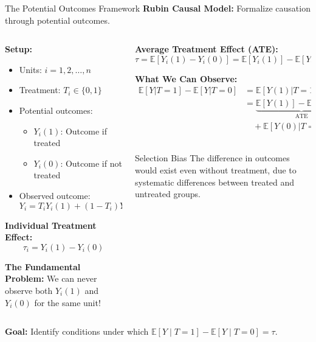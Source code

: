 \documentclass[aspectratio=169,11pt]{beamer}
\newcommand{\E}{\mathbb{E}}
\begin{document}
\begin{frame}{The Potential Outcomes Framework}
\textbf{Rubin Causal Model:} Formalize causation through potential outcomes.

\begin{columns}
\begin{column}{0.5\textwidth}
\textbf{Setup:}
\begin{itemize}
\item Units: $i = 1, 2, \ldots, n$
\item Treatment: $T_i \in \{0, 1\}$
\item Potential outcomes: 
  \begin{itemize}
  \item $Y_i(1)$: Outcome if treated
  \item $Y_i(0)$: Outcome if not treated
  \end{itemize}
\item Observed outcome: $Y_i = T_i Y_i(1) + (1-T_i) Y_i(0)$
\end{itemize}

\textbf{Individual Treatment Effect:}
\[\tau_i = Y_i(1) - Y_i(0)\]

\textbf{The Fundamental Problem:}
We can never observe both $Y_i(1)$ and $Y_i(0)$ for the same unit!
\end{column}
\begin{column}{0.5\textwidth}
\textbf{Average Treatment Effect (ATE):}
\[\tau = \E[Y_i(1) - Y_i(0)] = \E[Y_i(1)] - \E[Y_i(0)]\]

\textbf{What We Can Observe:}
\begin{align}
\E[Y|T=1] - \E[Y|T=0] &= \E[Y(1)|T=1] - \E[Y(0)|T=0]\\
&= \underbrace{\E[Y(1)] - \E[Y(0)]}_{\text{ATE}} \\
&\quad + \underbrace{\E[Y(0)|T=1] - \E[Y(0)|T=0]}_{\text{Selection Bias}}
\end{align}

\begin{alertblock}{Selection Bias}
The difference in outcomes would exist even without treatment, due to systematic differences between treated and untreated groups.
\end{alertblock}
\end{column}
\end{columns}

\textbf{Goal:} Identify conditions under which \(\mathbb{E}[Y\mid T=1] - \mathbb{E}[Y\mid T=0] = \tau\).
\end{frame}
\end{document}
